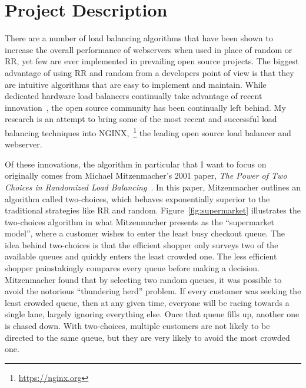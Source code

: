 \section{Project Description}
There are a number of load balancing algorithms that have been shown
to increase the overall performance of webservers when used in place
of random or RR, yet few are ever implemented in prevailing open
source projects. The biggest advantage of using RR and random from a
developers point of view is that they are intuitive algorithms that
are easy to implement and maintain. While dedicated hardware load
balancers continually take advantage of recent
innovation~\cite{nutbolt}, the open source community has been
continually left behind. My research is an attempt to bring some of
the most recent and successful load balancing techniques into
NGINX,~\footnote{\url{https://nginx.org}} the leading open source load
balancer and webserver.

Of these innovations, the algorithm in particular that I want to focus
on originally comes from Michael Mitzenmacher's 2001 paper,
\textit{The Power of Two Choices in Randomized Load
  Balancing}~\cite{mitzenmacher}. In this paper, Mitzenmacher outlines
an algorithm called two-choices, which behaves exponentially superior
to the traditional strategies like RR and random.
Figure~\ref{fig:supermarket} illustrates the two-choices algorithm in
what Mitzenmacher presents as the ``supermarket model'', where a
customer wishes to enter the least busy checkout queue. The idea
behind two-choices is that the efficient shopper only surveys two of
the available queues and quickly enters the least crowded one. The
less efficient shopper painstakingly compares every queue before
making a decision. Mitzenmacher found that by selecting two random
queues, it was possible to avoid the notorious ``thundering herd''
problem. If every customer was seeking the least crowded queue, then
at any given time, everyone will be racing towards a single lane,
largely ignoring everything else. Once that queue fills up, another
one is chased down. With two-choices, multiple customers are not
likely to be directed to the same queue, but they are very likely to
avoid the most crowded one.

